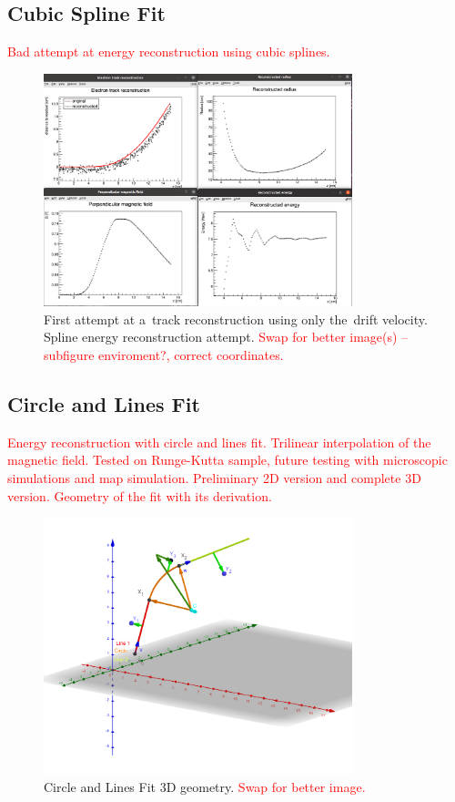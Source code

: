 \documentclass[]{article}
\begin{document}
		\subsection{Cubic Spline Fit}
			\textcolor{red}{Bad attempt at energy reconstruction using cubic splines.}
			
			\begin{figure}
				\centering
				\includegraphics[width=0.8\textwidth]{9010_splines.png}
				\caption{First attempt at a~track reconstruction using only the~drift velocity. Spline energy reconstruction attempt. \textcolor{red}{Swap for better image(s) -- subfigure enviroment?, correct coordinates.}}
				\label{fig:9010splines}
			\end{figure}
		
		\subsection{Circle and Lines Fit}
			\textcolor{red}{Energy reconstruction with circle and lines fit. Trilinear interpolation of the magnetic field. Tested on Runge-Kutta sample, future testing with microscopic simulations and map simulation. Preliminary 2D version and complete 3D version. Geometry of the fit with its derivation.}
			
			\begin{figure}
				\centering
				\includegraphics[width=0.8\textwidth]{circlefit.png}
				\caption{Circle and Lines Fit 3D geometry. \textcolor{red}{Swap for better image.}}
				\label{fig:circlefit}
			\end{figure}
					
\end{document}
